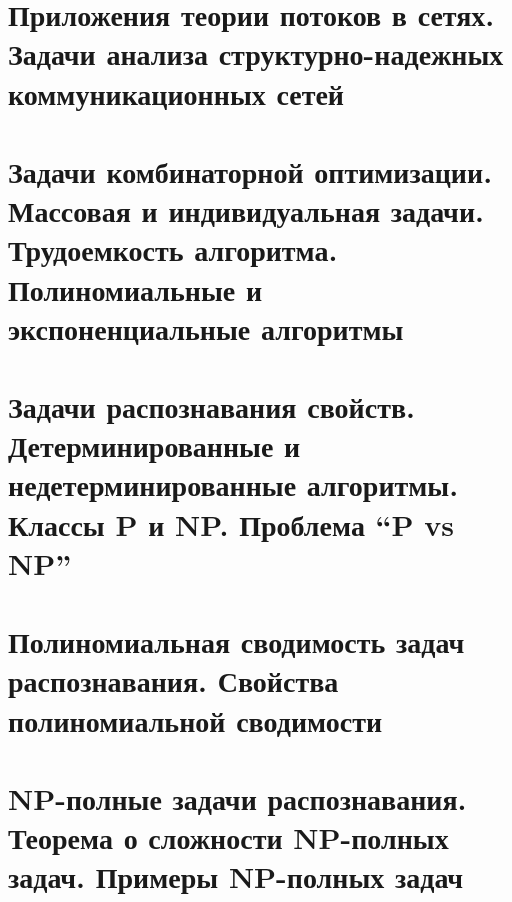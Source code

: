 \documentclass[a4paper]{article}
\theoremstyle{definition}
\theoremstyle{remark}
\begin{document}
    \section{Приложения теории потоков в сетях. Задачи анализа структурно-надежных 
    коммуникационных сетей}
    \section{Задачи комбинаторной оптимизации. Массовая и индивидуальная задачи. 
    Трудоемкость алгоритма. Полиномиальные и экспоненциальные алгоритмы}
    \section{Задачи распознавания свойств. Детерминированные и недетерминированные 
    алгоритмы. Классы P и NP. Проблема “P vs NP”}
    \section{Полиномиальная сводимость задач распознавания. Свойства полиномиальной 
    сводимости}
    \section{NP-полные задачи распознавания. Теорема о сложности NP-полных задач. Примеры 
    NP-полных задач}
\end{document}
